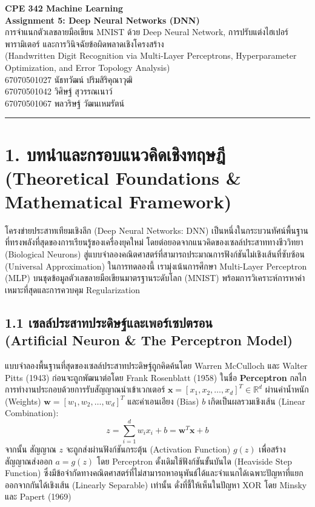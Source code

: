 \documentclass[12pt,a4paper]{article}
\begin{document}
\begin{center}
    {\Large\textbf{CPE 342 Machine Learning}}\\[2pt]
    {\Large\textbf{Assignment 5: Deep Neural Networks (DNN)}}\\[4pt]
    {\large การจำแนกตัวเลขลายมือเขียน MNIST ด้วย Deep Neural Network, การปรับแต่งไฮเปอร์พารามิเตอร์ และการวินิจฉัยข้อผิดพลาดเชิงโครงสร้าง}\\[2pt]
    {\normalsize (Handwritten Digit Recognition via Multi-Layer Perceptrons, Hyperparameter Optimization, and Error Topology Analysis)}\\[6pt]
    \textcolor{accentblue}{67070501027 นัธทวัฒน์ ปริมสิริคุณาวุฒิ}\\[2pt]
    \textcolor{accentblue}{67070501042 วิศิษฐ์ สุวรรณเนาว์}\\[2pt]
    \textcolor{accentblue}{67070501067 พลวริษฐ์ วัฒนเหมรัตน์}
\end{center}

\vspace{0.5em}
\hrule
\vspace{1em}

\section*{1. บทนำและกรอบแนวคิดเชิงทฤษฎี\\ \large(Theoretical Foundations \& Mathematical Framework)}

โครงข่ายประสาทเทียมเชิงลึก (Deep Neural Networks: DNN) เป็นหนึ่งในกระบวนทัศน์พื้นฐานที่ทรงพลังที่สุดของการเรียนรู้ของเครื่องยุคใหม่ โดยต่อยอดจากแนวคิดของเซลล์ประสาททางชีววิทยา (Biological Neurons) สู่แบบจำลองคณิตศาสตร์ที่สามารถประมาณการฟังก์ชันไม่เชิงเส้นที่ซับซ้อน (Universal Approximation) ในการทดลองนี้ เรามุ่งเน้นการศึกษา Multi-Layer Perceptron (MLP) บนชุดข้อมูลตัวเลขลายมือเขียนมาตรฐานระดับโลก (MNIST) พร้อมการวิเคราะห์การหาค่าเหมาะที่สุดและการควบคุม Regularization

\subsection*{1.1 เซลล์ประสาทประดิษฐ์และเพอร์เซปตรอน\\ \normalsize(Artificial Neuron \& The Perceptron Model)}
แบบจำลองพื้นฐานที่สุดของเซลล์ประสาทประดิษฐ์ถูกคิดค้นโดย Warren McCulloch และ Walter Pitts (1943) ก่อนจะถูกพัฒนาต่อโดย Frank Rosenblatt (1958) ในชื่อ \textbf{Perceptron} กลไกการทำงานประกอบด้วยการรับสัญญาณนำเข้าเวกเตอร์ $\mathbf{x} = [x_1, x_2, \dots, x_d]^T \in \mathbb{R}^d$ ผ่านค่าน้ำหนัก (Weights) $\mathbf{w} = [w_1, w_2, \dots, w_d]^T$ และค่าเอนเอียง (Bias) $b$ เกิดเป็นผลรวมเชิงเส้น (Linear Combination):
\begin{equation}
z = \sum_{i=1}^d w_i x_i + b = \mathbf{w}^T \mathbf{x} + b
\end{equation}
จากนั้น สัญญาณ $z$ จะถูกส่งผ่านฟังก์ชันกระตุ้น (Activation Function) $g(z)$ เพื่อสร้างสัญญาณส่งออก $a = g(z)$ โดย Perceptron ดั้งเดิมใช้ฟังก์ชันขั้นบันได (Heaviside Step Function) ซึ่งมีข้อจำกัดทางคณิตศาสตร์ที่ไม่สามารถหาอนุพันธ์ได้และจำแนกได้เฉพาะปัญหาที่แยกออกจากกันได้เชิงเส้น (Linearly Separable) เท่านั้น ดั่งที่ชี้ให้เห็นในปัญหา XOR โดย Minsky และ Papert (1969)
\end{document}
